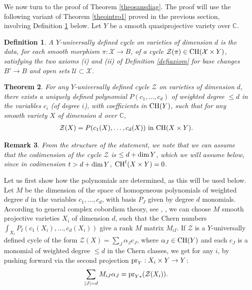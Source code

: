 \documentclass[10pt]{article}
\newtheorem{theo}{Theorem}[section]
\newtheorem{rema}[theo]{Remark}
\newtheorem{Defi}[theo]{Definition}
\begin{document}
We now turn to the proof of Theorem \ref{theosansdiag}.
 The proof will use  the following  variant of Theorem \ref{theointro1} proved in the previous section, involving   Definition \ref{defiY} below.
Let $Y$ be a smooth quasiprojective variety over $\mathbb{C}$.
\begin{Defi} \label{defiY} A $Y$-universally defined cycle on varieties of dimension $d$ is the data, for each smooth morphism $\pi: \mathcal{X}\rightarrow B$, of a cycle
$\mathcal{Z}(\pi)\in {\rm CH}(\mathcal{X}\times Y)$, satisfying the
two axioms (i) and (ii) of Definition \ref{defiaxiom} for base changes $B'\rightarrow B$ and open sets $\mathcal{U}\subset \mathcal{X}$.
\end{Defi}
\begin{theo} \label{theoY} For any $Y$-universally defined cycle $\mathcal{Z}$ on varieties of dimension $d$, there exists a uniquely defined
polynomial $P(c_1,\ldots, c_d)$ of weighted degree $\leq d$ in the variables
$c_i$ (of degree $i$), with coefficients in ${\rm CH}(Y)$, such that for any smooth variety
$X$ of dimension $d$ over $\mathbb{C}$,
\begin{eqnarray}\label{eqtheosansdiag} \mathcal{Z}(X)=P(c_1(X),\ldots, c_d(X))\,\,{\rm in}\,\,{\rm CH}(X\times Y).
\end{eqnarray}
\end{theo}
\begin{rema}\label{remadeg} {\rm From the structure of the statement, we note that we can assume that the codimension
of the cycle $\mathcal{Z}$ is $\leq d+{\rm dim}\,Y$, which we will assume below, since in codimension
$t> d+{\rm dim }\,Y$, ${\rm CH}^t(X\times Y)=0$.}
 \end{rema}
Let us first show how the polynomials are determined, as this will be used below. Let
$M$ be the dimension of the space of homogeneous polynomials  of weighted degree
$d$ in the variables $c_1,\ldots,c_d$, with basis  $P_J$ given by degree $d$ monomials. According
to general complex cobordism theory, see \cite{milnor}, \cite{thom}, we can choose $M$ smooth projective varieties $X_i$ of dimension $d$, such that
the Chern numbers $\int_{X_i}P_I(c_1(X_i),\ldots,c_d(X_i))$ give a rank $M$ matrix $M_{iI}$.
If $\mathcal{Z}$ is a $Y$-universally defined cycle of the form
$\mathcal{Z}(X)=\sum_J\alpha_J c_J$, where $\alpha_J\in {\rm CH}(Y)$ and each
$c_J$ is a monomial of weighted degree $\leq d$ in the Chern classes, we
get for any $i$, by pushing forward via the second projection ${\rm pr}_Y:X_i\times Y\rightarrow Y$:
\begin{eqnarray} \label{eqformpoudesc} \sum_{|J|=d}M_{iJ}\alpha_J ={\rm pr}_{Y*}(\mathcal{Z}(X_i)).
\end{eqnarray}
\end{document}
